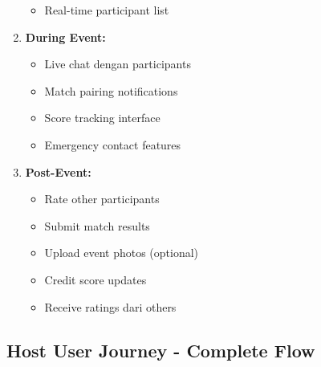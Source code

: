 \documentclass[12pt,a4paper]{article}
\begin{document}
\begin{implemented}
\begin{enumerate}
\begin{itemize}
        \item Real-time participant list
    \end{itemize}
    \item \textbf{During Event:}
    \begin{itemize}
        \item Live chat dengan participants
        \item Match pairing notifications
        \item Score tracking interface
        \item Emergency contact features
    \end{itemize}
    \item \textbf{Post-Event:}
    \begin{itemize}
        \item Rate other participants
        \item Submit match results
        \item Upload event photos (optional)
        \item Credit score updates
        \item Receive ratings dari others
    \end{itemize}
\end{enumerate}
\end{implemented}

\subsection{Host User Journey - Complete Flow}
\end{document}

